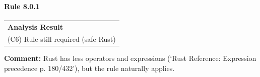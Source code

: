 \paragraph{Rule 8.0.1}
\begin{longtable}{p{13cm}}
\textbf{Analysis Result} \\
(C6) Rule still required (safe Rust) \\
\end{longtable}
\textbf{Comment:} Rust has less operators and expressions (`Rust Reference: Expression precedence p. 180/432'), but the rule naturally applies. \\

